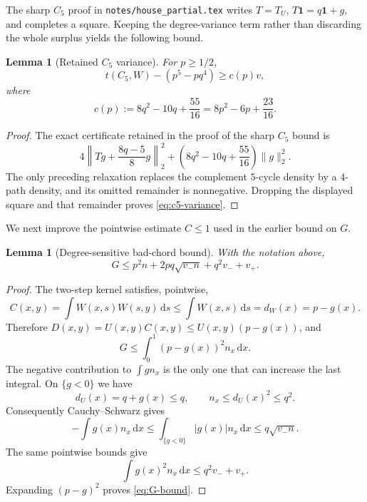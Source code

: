 \documentclass[11pt]{article}
\newtheorem{lemma}[theorem]{Lemma}
\theoremstyle{remark}
\newcommand{\dd}{\,\mathrm d}
\newcommand{\one}{\mathbf 1}
\begin{document}
The sharp $C_5$ proof in \texttt{notes/house\_partial.tex} writes
$T=T_U$, $T\one=q\one+g$, and completes a square.  Keeping the
degree-variance term rather than discarding the whole surplus yields the
following bound.

\begin{lemma}[Retained $C_5$ variance]\label{lem:c5-variance}
For $p\geq1/2$,
\begin{equation}\label{eq:c5-variance}
 t(C_5,W)-(p^5-pq^4)\geq c(p)v,
\end{equation}
where
\begin{equation}\label{eq:c-def}
 c(p):=8q^2-10q+\frac{55}{16}
      =8p^2-6p+\frac{23}{16}.
\end{equation}
\end{lemma}

\begin{proof}
The exact certificate retained in the proof of the sharp $C_5$ bound is
\[
 4\left\|Tg+\frac{8q-5}{8}g\right\|_2^2
 +\left(8q^2-10q+\frac{55}{16}\right)\|g\|_2^2.
\]
The only preceding relaxation replaces the complement $5$-cycle density
by a $4$-path density, and its omitted remainder is nonnegative.  Dropping
the displayed square and that remainder proves
\eqref{eq:c5-variance}.
\end{proof}

We next improve the pointwise estimate $C\leq1$ used in the earlier
bound on $G$.

\begin{lemma}[Degree-sensitive bad-chord bound]\label{lem:G-bound}
With the notation above,
\begin{equation}\label{eq:G-bound}
 G\leq p^2n+2pq\sqrt{v_-n}+q^2v_-+v_+.
\end{equation}
\end{lemma}

\begin{proof}
The two-step kernel satisfies, pointwise,
\[
 C(x,y)
 =\int W(x,s)W(s,y)\dd s
 \leq\int W(x,s)\dd s
 =d_W(x)=p-g(x).
\]
Therefore $D(x,y)=U(x,y)C(x,y)\leq U(x,y)(p-g(x))$, and
\[
 G\leq\int_0^1(p-g(x))^2n_x\dd x.
\]
The negative contribution to $\int g n_x$ is the only one that can
increase the last integral.  On $\{g<0\}$ we have
\[
 d_U(x)=q+g(x)\leq q,
 \qquad
 n_x\leq d_U(x)^2\leq q^2.
\]
Consequently Cauchy--Schwarz gives
\[
 -\int g(x)n_x\dd x
 \leq\int_{\{g<0\}}|g(x)|n_x\dd x
 \leq q\sqrt{v_-n}.
\]
The same pointwise bounds give
\[
 \int g(x)^2n_x\dd x
 \leq q^2v_-+v_+.
\]
Expanding $(p-g)^2$ proves \eqref{eq:G-bound}.
\end{proof}
\end{document}
